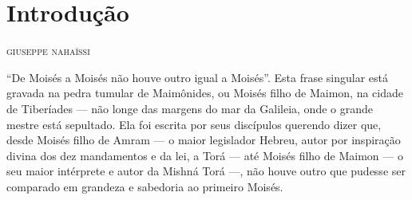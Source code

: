 %


%
%
%
%

\chapter{Introdução}

\begin{flushright}
\textsc{giuseppe nahaïssi}
\end{flushright}

\noindent{}``De Moisés a Moisés não houve outro igual a Moisés''. Esta frase
singular está gravada na pedra tumular de Maimônides, ou Moisés filho
de Maimon, na cidade de Tiberíades --- não longe das margens do mar da
Galileia, onde o grande mestre está sepultado. Ela foi escrita por
seus discípulos querendo dizer que, desde Moisés filho de Amram --- o
maior legislador Hebreu, autor por inspiração divina dos dez mandamentos
e da lei, a Torá --- até Moisés filho de Maimon --- o seu maior
intérprete e autor da Mishná Torá ---, não houve outro que
pudesse ser comparado em grandeza e sabedoria ao primeiro Moisés.

